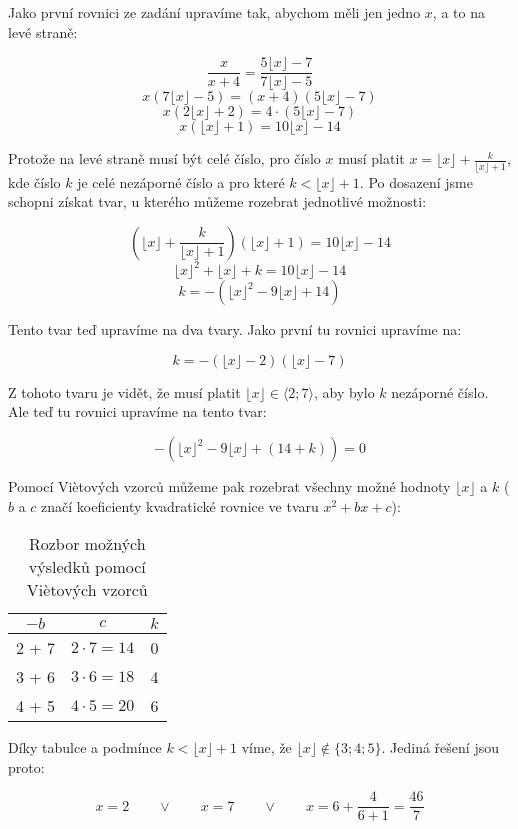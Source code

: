 \documentclass{fkssolpub}
\author{Ondřej Sedláček}
\begin{document}
Jako první rovnici ze zadání upravíme tak, abychom měli jen
jedno $x$, a to na levé straně:

\[
	\frac{x}{x + 4} = \frac{5 \lfloor x \rfloor - 7}{7 \lfloor x \rfloor - 5}
\]
\[
	x (7 \lfloor x \rfloor - 5) = (x + 4)(5 \lfloor x \rfloor - 7)
\]
\[
	x (2 \lfloor x \rfloor + 2) = 4 \cdot (5 \lfloor x \rfloor - 7)
\]
\[
	x (\lfloor x \rfloor + 1) = 10 \lfloor x \rfloor - 14
\]

Protože na levé straně musí být celé číslo, pro číslo $x$ musí platit
$x = \lfloor x \rfloor + \frac{k}{\lfloor x \rfloor + 1}$, kde číslo $k$
je celé nezáporné číslo a pro které $k < \lfloor x \rfloor + 1$. Po dosazení
jsme schopni získat tvar, u kterého můžeme rozebrat jednotlivé možnosti:

\[
	\left(\lfloor x \rfloor + \frac{k}{\lfloor x \rfloor + 1}\right) \left(\lfloor x \rfloor + 1\right)
	= 10 \lfloor x \rfloor - 14
\]
\[
	\lfloor x \rfloor^2 + \lfloor x \rfloor + k = 10 \lfloor x \rfloor - 14
\]
\[
	k = -\left(\lfloor x \rfloor^2 - 9 \lfloor x \rfloor + 14\right)
\]

Tento tvar teď upravíme na dva tvary. Jako první tu rovnici upravíme na:

\[
	k = -( \lfloor x \rfloor - 2) (\lfloor x \rfloor - 7)
\]

Z tohoto tvaru je vidět, že musí platit $\lfloor x \rfloor \in \langle 2; 7 \rangle$, aby
bylo $k$ nezáporné číslo. Ale teď tu rovnici upravíme na tento tvar:

\[
	-\left(\lfloor x \rfloor^2 - 9 \lfloor x \rfloor + (14 + k)\right) = 0
\]

Pomocí Vi\`{e}tových vzorců můžeme pak rozebrat všechny možné hodnoty
$\lfloor x \rfloor$ a $k$ ($b$ a $c$ značí koeficienty kvadratické rovnice
ve tvaru $x^2 + bx + c$):

\begin{table}[h!]
	\centering
	\begin{tabular}{|c|c|c|}
		\hline
		$-b$  & $c$              & $k$ \\
		\hline
		2 + 7 & $2 \cdot 7 = 14$ & 0   \\
		3 + 6 & $3 \cdot 6 = 18$ & 4   \\
		4 + 5 & $4 \cdot 5 = 20$ & 6   \\
		\hline
	\end{tabular}
	\caption{Rozbor možných výsledků pomocí Vi\`{e}tových vzorců}
\end{table}

Díky tabulce a podmínce $k < \lfloor x \rfloor + 1$ víme,
že $\lfloor x \rfloor \notin \{ 3; 4; 5\}$. Jediná řešení jsou proto:

\[
	x = 2 \qquad \lor \qquad x = 7 \qquad \lor \qquad x = 6 + \frac{4}{6 + 1} = \frac{46}{7}
\]
\end{document}
